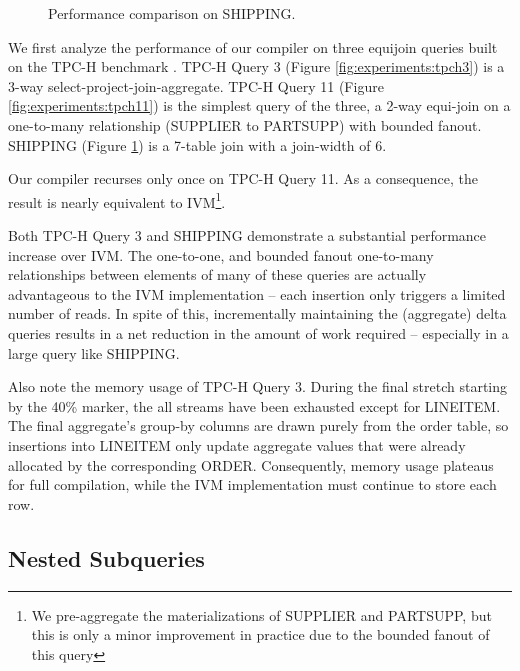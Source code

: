 \begin{figure}
\begin{center}
\caption{Performance comparison on SHIPPING.}
\label{fig:experiments:ssb4}
\end{center}
\end{figure}

We first analyze the performance of our compiler on three equijoin queries built on the TPC-H benchmark .  TPC-H Query 3 (Figure \ref{fig:experiments:tpch3}) is a 3-way select-project-join-aggregate.  TPC-H Query 11 (Figure \ref{fig:experiments:tpch11}) is the simplest query of the three, a 2-way equi-join on a one-to-many relationship (SUPPLIER to PARTSUPP) with bounded fanout.  SHIPPING (Figure \ref{fig:experiments:ssb4}) is a 7-table join with a join-width of 6.  

Our compiler recurses only once on TPC-H Query 11.  As a consequence, the result is nearly equivalent to IVM\footnote{We pre-aggregate the materializations of SUPPLIER and PARTSUPP, but this is only a minor improvement in practice due to the bounded fanout of this query}.  

Both TPC-H Query 3 and SHIPPING demonstrate a substantial performance increase over IVM.  The one-to-one, and bounded fanout one-to-many relationships between elements of many of these queries are actually advantageous to the IVM implementation -- each insertion only triggers a limited number of reads.  In spite of this, incrementally maintaining the (aggregate) delta queries results in a net reduction in the amount of work required -- especially in a large query like SHIPPING.

Also note the memory usage of TPC-H Query 3.  During the final stretch starting by the 40\% marker, the all streams have been exhausted except for LINEITEM.  The final aggregate's group-by columns are drawn purely from the order table, so insertions into LINEITEM only update aggregate values that were already  allocated by the corresponding ORDER.  Consequently, memory usage plateaus for full compilation, while the IVM implementation must continue to store each row.

\subsection{Nested Subqueries}

